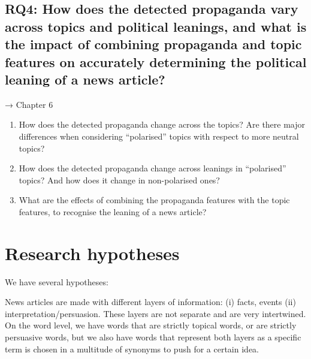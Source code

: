 \subsection{RQ4: How does the detected propaganda vary across topics and political leanings, and what is the impact of combining propaganda and topic features on accurately determining the political leaning of a news article?}
→ Chapter 6
\begin{enumerate}[label={\textbf{RQ4.\arabic*:}},leftmargin=2cm]
    \item How does the detected propaganda change across the topics? Are there major differences when considering “polarised” topics with respect to more neutral topics?
    \item How does the detected propaganda change across leanings in “polarised” topics? And how does it change in non-polarised ones?
    \item What are the effects of combining the propaganda features with the topic features, to recognise the leaning of a news article?
\end{enumerate}





\section{Research hypotheses}
\label{sec:intro_hyp}

We have several hypotheses:

News articles are made with different layers of information: (i) facts, events (ii) interpretation/persuasion.
These layers are not separate and are very intertwined. On the word level, we have words that are strictly topical words, or are strictly persuasive words, but we also have words that represent both layers as a specific term is chosen in a multitude of synonyms to push for a certain idea.


